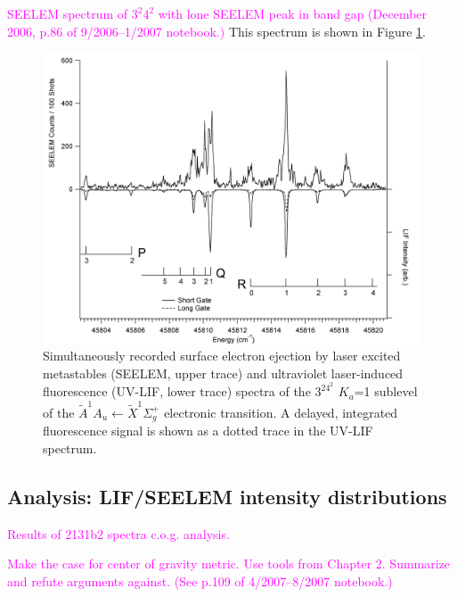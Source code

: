 \documentclass[12pt,draft]{mitthesis}
\newcommand{\POINT}[1]{\textcolor{magenta}{#1}}
\begin{document}
\POINT{SEELEM spectrum of $3^2 4^2$ with lone SEELEM peak in band gap
  (December 2006, p.86 of 9/2006--1/2007 notebook.)}  This spectrum is
shown in Figure \ref{fig:spectrum-32b2}.

\begin{figure}
  \caption{
    Simultaneously recorded surface electron ejection by laser excited
    metastables (SEELEM, upper trace) and ultraviolet laser-induced
    fluorescence (UV-LIF, lower trace) spectra of the $3^24^2$ $K_a$=1
    sublevel of the $\tilde{A}^1A_u \leftarrow \tilde{X} ^1\Sigma_g^+$
    electronic transition. A delayed, integrated fluorescence signal
    is shown as a dotted trace in the UV-LIF spectrum.}
  \label{fig:spectrum-32b2}
  \centering
  \includegraphics[width=7.5in,angle=90]{spectrum-32b2.png}
\end{figure}

\subsection{Analysis: LIF/SEELEM intensity distributions}

\POINT{Results of 2131b2 spectra c.o.g. analysis.}

\POINT{Make the case for center of gravity metric. Use tools from
  Chapter 2.  Summarize and refute arguments against.  (See p.109 of
  4/2007--8/2007 notebook.)}

\end{document}
